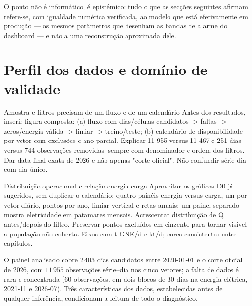 O ponto não é informático, é epistémico: tudo o que as secções seguintes
afirmam refere-se, com igualdade numérica verificada, ao modelo que está
efetivamente em produção --- os mesmos parâmetros que desenham as bandas de
alarme do dashboard --- e não a uma reconstrução aproximada dele.

\section{Perfil dos dados e domínio de validade}
\label{sec:perfil-dados}
{Amostra e filtros precisam de um fluxo e de um calendário}
{Antes dos resultados, inserir figura composta: (a) fluxo com dias/células
candidatos -\textgreater{} faltas -\textgreater{} zeros/energia válida -\textgreater{} limiar -\textgreater{} treino/teste;
(b) calendário de disponibilidade por vetor com exclusões e ano parcial.
Explicar 11 955 versus 11 467 e 251 dias versus 744 observações removidas,
sempre com denominador e ordem dos filtros. Dar data final exata de 2026
e não apenas "corte oficial". Não confundir série-dia com dia único.}%

{Distribuição operacional e relação energia-carga}
{Aproveitar os gráficos D0 já sugeridos, sem duplicar o calendário:
quatro painéis energia versus carga, um por vetor diário, pontos por ano,
limiar vertical e retas anuais; um painel separado mostra eletricidade
em patamares mensais. Acrescentar distribuição de Q antes/depois do filtro.
Preservar pontos excluídos em cinzento para tornar visível a população
não coberta. Eixos com t GNE/d e kt/d; cores consistentes entre capítulos.}%

O painel analisado cobre $2\,403$ dias candidatos entre 2020-01-01 e o corte
oficial de 2026, com $11\,955$ observações série--dia nos cinco vetores; a
falta de dados é rara e concentrada (60 observações, em dois blocos de 30 dias
na energia elétrica, 2021-11 e 2026-07). Três características dos dados,
estabelecidas antes de qualquer inferência, condicionam a leitura de todo o
diagnóstico.


